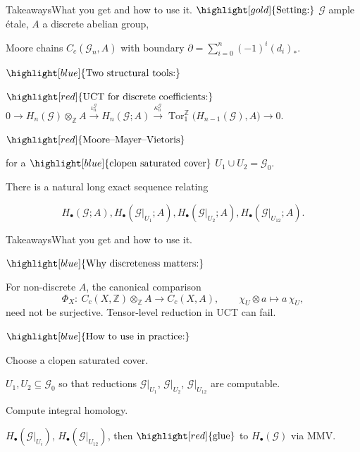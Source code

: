 \documentclass[aspectratio=169]{beamer}
\newcommand{\G}{\mathcal{G}}
\newcommand{\ZZ}{\mathbb{Z}}
\begin{document}
\begin{frame}{Takeaways}{What you get and how to use it.}
\(\highlight[gold]{\text{Setting:}}\)
\(\G\) ample \'etale, \(A\) a discrete abelian group,

Moore chains \(C_c(\G_n,A)\) with boundary \(\partial=\sum_{i=0}^n (-1)^i(d_i)_*\).

\vspace{0.3cm}

\begin{center}
    \(\highlight[blue]{\text{Two structural tools:}}\)
\end{center}
\pause

\(\highlight[red]{\text{UCT for discrete coefficients:}}\)
\(
    0\to H_n(\G)\otimes_{\ZZ}A
    \xrightarrow{\iota_n^{\G}}
    H_n(\G;A)
    \xrightarrow{\kappa_n^{\G}}
    \operatorname{Tor}_1^{\ZZ}\bigl(H_{n-1}(\G),A\bigr)\to 0.
\)
\vspace{0.2cm}
\pause

\(\highlight[red]{\text{Moore--Mayer--Vietoris}}\)

for a \(\highlight[blue]{\text{clopen saturated cover}}\)
\(U_1\cup U_2=\G_0\).

There is a natural long exact sequence relating

\[
H_\bullet(\G;A), H_\bullet(\G|_{U_1};A), H_\bullet(\G|_{U_2};A), H_\bullet(\G|_{U_{12}};A).
\]
\end{frame}

\begin{frame}{Takeaways}{What you get and how to use it.}
\begin{center}
\(\highlight[blue]{\text{Why discreteness matters:}}\)
\end{center}

For non-discrete \(A\), the canonical comparison
\[
\Phi_X:\ C_c(X,\ZZ)\otimes_{\ZZ}A \to C_c(X,A),
\qquad
\chi_U\otimes a \mapsto a\,\chi_U,
\]
need not be surjective. Tensor-level reduction in UCT can fail.

\vspace{0.1cm}
\pause

\begin{center}
\(\highlight[blue]{\text{How to use in practice:}}\)
\end{center}

Choose a clopen saturated cover.

\(U_1,U_2\subseteq \G_0\) so that reductions \(\G|_{U_1}\), \(\G|_{U_2}\), \(\G|_{U_{12}}\) are computable.

Compute integral homology.

\(H_\bullet(\G|_{U_i})\), \(H_\bullet(\G|_{U_{12}})\),
then \(\highlight[red]{\text{glue}}\) to \(H_\bullet(\G)\) via MMV.
\end{frame}
\end{document}
